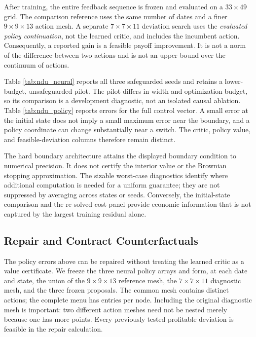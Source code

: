 After training, the entire feedback sequence is frozen and evaluated on a $33\times49$ grid. The comparison reference uses the same number of dates and a finer $9\times9\times13$ action mesh. A separate $7\times7\times11$ deviation search uses the \emph{evaluated policy continuation}, not the learned critic, and includes the incumbent action. Consequently, a reported gain is a feasible payoff improvement. It is not a norm of the difference between two actions and is not an upper bound over the continuum of actions.

Table \ref{tab:ndu_neural} reports all three safeguarded seeds and retains a lower-budget, unsafeguarded pilot. The pilot differs in width and optimization budget, so its comparison is a development diagnostic, not an isolated causal ablation. Table \ref{tab:ndu_policy} reports errors for the full control vector. A small error at the initial state does not imply a small maximum error near the boundary, and a policy coordinate can change substantially near a switch. The critic, policy value, and feasible-deviation columns therefore remain distinct.



The hard boundary architecture attains the displayed boundary condition to numerical precision. It does not certify the interior value or the Brownian stopping approximation. The sizable worst-case diagnostics identify where additional computation is needed for a uniform guarantee; they are not suppressed by averaging across states or seeds. Conversely, the initial-state comparison and the re-solved cost panel provide economic information that is not captured by the largest training residual alone.

\subsection{Repair and Contract Counterfactuals}
The policy errors above can be repaired without treating the learned critic as a value certificate. We freeze the three neural policy arrays and form, at each date and state, the union of the $9\times9\times13$ reference mesh, the $7\times7\times11$ diagnostic mesh, and the three frozen proposals. The common mesh contains \NBOCommonActions{} distinct actions; the complete menu has \NBOActions{} entries per node. Including the original diagnostic mesh is important: two different action meshes need not be nested merely because one has more points. Every previously tested profitable deviation is feasible in the repair calculation.

